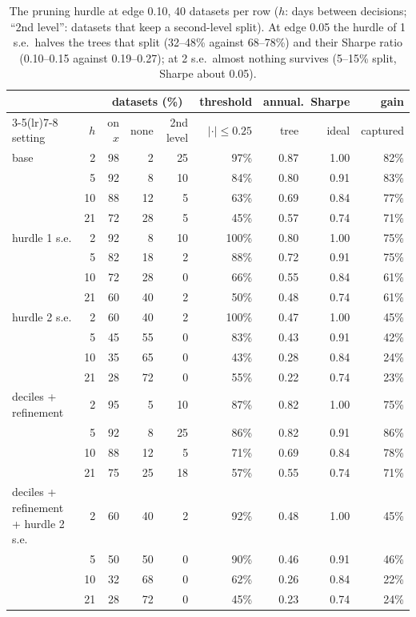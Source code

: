 \documentclass[11pt,a4paper]{article}
\newcommand{\1}{\mathbf{1}}
\begin{document}
\begin{table}[H]
\centering\small
\setlength{\tabcolsep}{4pt}
\begin{tabular}{@{}l r rrr r rr r@{}}
\toprule
& & \multicolumn{3}{c}{datasets (\%)} & threshold & \multicolumn{2}{c}{annual.\ Sharpe} & gain\\
\cmidrule(lr){3-5}\cmidrule(lr){7-8}
setting & $h$ & on $x$ & none & 2nd level & $|\cdot|\le0.25$ & tree & ideal & captured\\
\midrule
base & 2 & 98 & 2 & 25 & 97\% & 0.87 & 1.00 & 82\%\\
 & 5 & 92 & 8 & 10 & 84\% & 0.80 & 0.91 & 83\%\\
 & 10 & 88 & 12 & 5 & 63\% & 0.69 & 0.84 & 77\%\\
 & 21 & 72 & 28 & 5 & 45\% & 0.57 & 0.74 & 71\%\\
\midrule
hurdle 1 s.e. & 2 & 92 & 8 & 10 & 100\% & 0.80 & 1.00 & 75\%\\
 & 5 & 82 & 18 & 2 & 88\% & 0.72 & 0.91 & 75\%\\
 & 10 & 72 & 28 & 0 & 66\% & 0.55 & 0.84 & 61\%\\
 & 21 & 60 & 40 & 2 & 50\% & 0.48 & 0.74 & 61\%\\
\midrule
hurdle 2 s.e. & 2 & 60 & 40 & 2 & 100\% & 0.47 & 1.00 & 45\%\\
 & 5 & 45 & 55 & 0 & 83\% & 0.43 & 0.91 & 42\%\\
 & 10 & 35 & 65 & 0 & 43\% & 0.28 & 0.84 & 24\%\\
 & 21 & 28 & 72 & 0 & 55\% & 0.22 & 0.74 & 23\%\\
\midrule
deciles + refinement & 2 & 95 & 5 & 10 & 87\% & 0.82 & 1.00 & 75\%\\
 & 5 & 92 & 8 & 25 & 86\% & 0.82 & 0.91 & 86\%\\
 & 10 & 88 & 12 & 5 & 71\% & 0.69 & 0.84 & 78\%\\
 & 21 & 75 & 25 & 18 & 57\% & 0.55 & 0.74 & 71\%\\
\midrule
deciles + refinement + hurdle 2 s.e. & 2 & 60 & 40 & 2 & 92\% & 0.48 & 1.00 & 45\%\\
 & 5 & 50 & 50 & 0 & 90\% & 0.46 & 0.91 & 46\%\\
 & 10 & 32 & 68 & 0 & 62\% & 0.26 & 0.84 & 22\%\\
 & 21 & 28 & 72 & 0 & 45\% & 0.23 & 0.74 & 24\%\\
\bottomrule
\end{tabular}
\caption{The pruning hurdle at edge 0.10, 40 datasets per row ($h$: days between decisions; ``2nd level'': datasets that keep a second-level split). At edge 0.05 the hurdle of 1 s.e.\ halves the trees that split (32--48\% against 68--78\%) and their Sharpe ratio (0.10--0.15 against 0.19--0.27); at 2 s.e.\ almost nothing survives (5--15\% split, Sharpe about 0.05).}
\label{tab:pruning}
\end{table}
\end{document}
